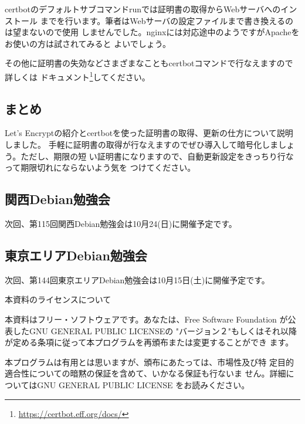 \documentclass[mingoth,a4paper]{jsarticle}
\begin{document}
certbotのデフォルトサブコマンドrunでは証明書の取得からWebサーバへのインストール
までを行います。筆者はWebサーバの設定ファイルまで書き換えるのは望まないので使用
しませんでした。nginxには対応途中のようですがApacheをお使いの方は試されてみると
よいでしょう。

その他に証明書の失効などさまざまなこともcertbotコマンドで行なえますので詳しくは
ドキュメント\footnote{\url{https://certbot.eff.org/docs/}}してください。


\subsection{まとめ}

Let's Encryptの紹介とcertbotを使った証明書の取得、更新の仕方について説明しました。
手軽に証明書の取得が行なえますのでぜひ導入して暗号化しましょう。ただし、期限の短
い証明書になりますので、自動更新設定をきっちり行なって期限切れにならないよう気を
つけてください。



\subsection{関西Debian勉強会}
次回、第115回関西Debian勉強会は10月24(日)に開催予定です。

\subsection{東京エリアDebian勉強会}
次回、第144回東京エリアDebian勉強会は10月15日(土)に開催予定です。

%
\mbox{}\newpage
\mbox{}\newpage

\pagebreak

\begin{center}
本資料のライセンスについて
\end{center}

本資料はフリー・ソフトウェアです。あなたは、Free Software
Foundation が公表したGNU GENERAL PUBLIC LICENSEの "バージョン２"もしくはそれ以降
が定める条項に従って本プログラムを再頒布または変更することができ
ます。

本プログラムは有用とは思いますが、頒布にあたっては、市場性及び特
定目的適合性についての暗黙の保証を含めて、いかなる保証も行ないま
せん。詳細についてはGNU GENERAL PUBLIC LICENSE をお読みください。
\end{document}
